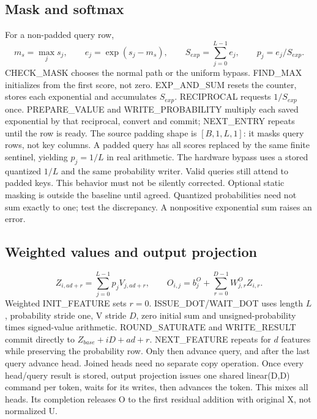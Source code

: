 \documentclass[11pt,a4paper]{article}
\begin{document}
\subsection{Mask and softmax}
For a non-padded query row,
\[
m_s=\max_j s_j,\qquad e_j=\exp(s_j-m_s),\qquad
S_{exp}=\sum_{j=0}^{L-1}e_j,\qquad p_j=e_j/S_{exp}.
\]
CHECK\_MASK chooses the normal path or the uniform bypass. FIND\_MAX initializes from the first score, not zero. EXP\_AND\_SUM resets the counter, stores each exponential and accumulates $S_{exp}$. RECIPROCAL requests $1/S_{exp}$ once. PREPARE\_VALUE and WRITE\_PROBABILITY multiply each saved exponential by that reciprocal, convert and commit; NEXT\_ENTRY repeats until the row is ready.
The source padding shape is $[B,1,L,1]$: it masks query rows, not key columns. A padded query has all scores replaced by the same finite sentinel, yielding $p_j=1/L$ in real arithmetic. The hardware bypass uses a stored quantized $1/L$ and the same probability writer. Valid queries still attend to padded keys. This behavior must not be silently corrected. Optional static masking is outside the baseline until agreed. Quantized probabilities need not sum exactly to one; test the discrepancy. A nonpositive exponential sum raises an error.

\subsection{Weighted values and output projection}
\[
Z_{i,ad+r}=\sum_{j=0}^{L-1}p_j V_{j,ad+r},\qquad
O_{i,j}=b^O_j+\sum_{r=0}^{D-1}W^O_{j,r}Z_{i,r}.
\]
Weighted INIT\_FEATURE sets $r=0$. ISSUE\_DOT/WAIT\_DOT uses length $L$, probability stride one, V stride $D$, zero initial sum and unsigned-probability times signed-value arithmetic. ROUND\_SATURATE and WRITE\_RESULT commit directly to $Z_{base}+iD+ad+r$. NEXT\_FEATURE repeats for $d$ features while preserving the probability row. Only then advance query, and after the last query advance head. Joined heads need no separate copy operation.
Once every head/query result is stored, output projection issues one shared linear(D,D) command per token, waits for its writes, then advances the token. This mixes all heads. Its completion releases O to the first residual addition with original X, not normalized U.
\end{document}
